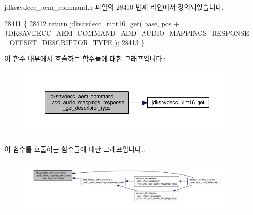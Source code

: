 jdksavdecc\+\_\+aem\+\_\+command.\+h 파일의 28410 번째 라인에서 정의되었습니다.


\begin{DoxyCode}
28411 \{
28412     \textcolor{keywordflow}{return} \hyperlink{group__endian_ga3fbbbc20be954aa61e039872965b0dc9}{jdksavdecc\_uint16\_get}( base, pos + 
      \hyperlink{group__command__add__audio__mappings__response_ga43929177bf6b30c0ad3a6815cfe3627d}{JDKSAVDECC\_AEM\_COMMAND\_ADD\_AUDIO\_MAPPINGS\_RESPONSE\_OFFSET\_DESCRIPTOR\_TYPE}
       );
28413 \}
\end{DoxyCode}


이 함수 내부에서 호출하는 함수들에 대한 그래프입니다.\+:
\nopagebreak
\begin{figure}[H]
\begin{center}
\leavevmode
\includegraphics[width=350pt]{group__command__add__audio__mappings__response_ga608374a64878861178106de48db53a1d_cgraph}
\end{center}
\end{figure}




이 함수를 호출하는 함수들에 대한 그래프입니다.\+:
\nopagebreak
\begin{figure}[H]
\begin{center}
\leavevmode
\includegraphics[width=350pt]{group__command__add__audio__mappings__response_ga608374a64878861178106de48db53a1d_icgraph}
\end{center}
\end{figure}



